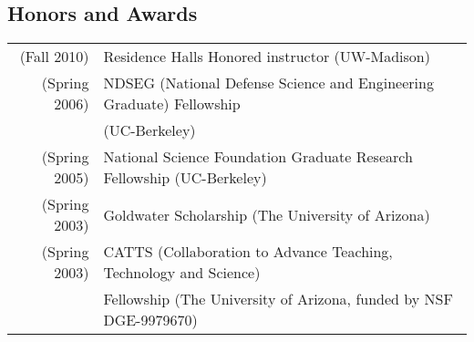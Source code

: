 \documentclass[margin,line]{res}
\newcommand{\defi}[1]{\textsf{#1}} 				%
\begin{document}
\begin{resume}
\section{\sc Honors and Awards}
\begin{tabular}{rl}
(Fall 2010) & \defi{Residence Halls Honored instructor} (UW-Madison)\\
  (Spring 2006) & \defi{NDSEG (National Defense Science and Engineering Graduate) Fellowship} \\
  &  (UC-Berkeley)\\
(Spring 2005) & \defi{National Science Foundation Graduate Research Fellowship} (UC-Berkeley) \\
(Spring 2003) & \defi{Goldwater Scholarship} (The University of Arizona)\\
  (Spring 2003) & \defi{CATTS (Collaboration to Advance Teaching, Technology and Science)} \\
  & \defi{Fellowship} (The University of Arizona, funded by NSF DGE-9979670)
\end{tabular}






\end{resume}
\end{document}
